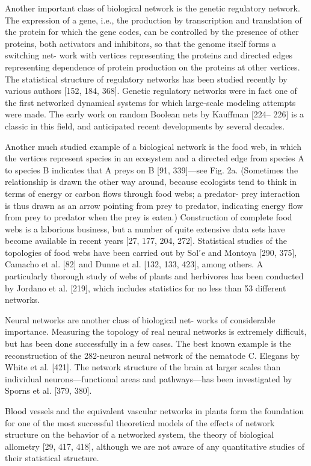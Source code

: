       Another important class of biological network is the genetic regulatory network. The expression of a gene, i.e., the production by transcription and translation of the protein for which the gene codes, can be controlled by the presence of other proteins, both activators and inhibitors, so that the genome itself forms a switching net- work with vertices representing the proteins and directed edges representing dependence of protein production on the proteins at other vertices. The statistical structure of regulatory networks has been studied recently by various authors [152, 184, 368]. Genetic regulatory networks were in fact one of the first networked dynamical systems for which large-scale modeling attempts were made. The early work on random Boolean nets by Kauffman [224– 226] is a classic in this field, and anticipated recent developments by several decades.
      
      Another much studied example of a biological network is the food web, in which the vertices represent species in an ecosystem and a directed edge from species A to species B indicates that A preys on B [91, 339]—see Fig. 2a. (Sometimes the relationship is drawn the other way around, because ecologists tend to think in terms of energy or carbon flows through food webs; a predator- prey interaction is thus drawn as an arrow pointing from prey to predator, indicating energy flow from prey to predator when the prey is eaten.) Construction of complete food webs is a laborious business, but a number of quite extensive data sets have become available in recent years [27, 177, 204, 272]. Statistical studies of the topologies of food webs have been carried out by Sol ́e and Montoya [290, 375], Camacho et al. [82] and Dunne et al. [132, 133, 423], among others. A particularly thorough study of webs of plants and herbivores has been conducted by Jordano et al. [219], which includes statistics for no less than 53 different networks.
      
      Neural networks are another class of biological net- works of considerable importance. Measuring the topology of real neural networks is extremely difficult, but has been done successfully in a few cases. The best known example is the reconstruction of the 282-neuron neural network of the nematode C. Elegans by White et al. [421]. The network structure of the brain at larger scales than individual neurons—functional areas and pathways—has been investigated by Sporns et al. [379, 380].
      
      Blood vessels and the equivalent vascular networks in plants form the foundation for one of the most successful theoretical models of the effects of network structure on the behavior of a networked system, the theory of biological allometry [29, 417, 418], although we are not aware of any quantitative studies of their statistical structure.
      
